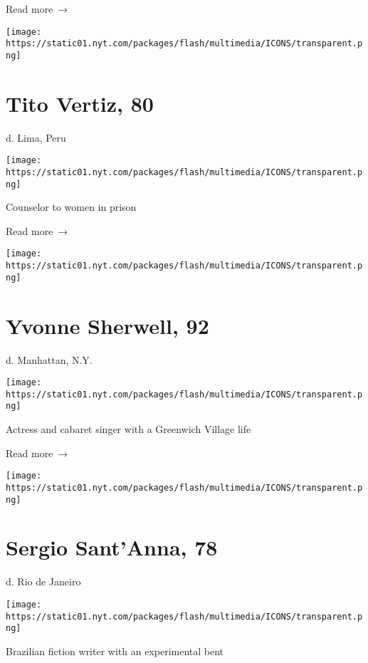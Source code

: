  Read more~→

\href{https://www.nytimes.com/2020/07/01/obituaries/tito-vertiz-dead-coronavirus.html}{}

\texttt{[image: https://static01.nyt.com/packages/flash/multimedia/ICONS/transparent.png]}

\hypertarget{tito-vertiz-80}{%
\section{Tito Vertiz, 80}\label{tito-vertiz-80}}

d. Lima, Peru

\texttt{[image: https://static01.nyt.com/packages/flash/multimedia/ICONS/transparent.png]}

Counselor to women in prison

 Read more~→

\href{https://www.nytimes.com/2020/06/29/obituaries/yvonne-sherwell-dead-coronavirus.html}{}

\texttt{[image: https://static01.nyt.com/packages/flash/multimedia/ICONS/transparent.png]}

\hypertarget{yvonne-sherwell-92}{%
\section{Yvonne Sherwell, 92}\label{yvonne-sherwell-92}}

d. Manhattan, N.Y.

\texttt{[image: https://static01.nyt.com/packages/flash/multimedia/ICONS/transparent.png]}

Actress and cabaret singer with a Greenwich Village life

 Read more~→

\href{https://www.nytimes.com/2020/06/29/obituaries/sergio-santanna-dead-coronavirus.html}{}

\texttt{[image: https://static01.nyt.com/packages/flash/multimedia/ICONS/transparent.png]}

\hypertarget{sergio-santanna-78}{%
\section{Sergio Sant'Anna, 78}\label{sergio-santanna-78}}

d. Rio de Janeiro

\texttt{[image: https://static01.nyt.com/packages/flash/multimedia/ICONS/transparent.png]}

Brazilian fiction writer with an experimental bent

